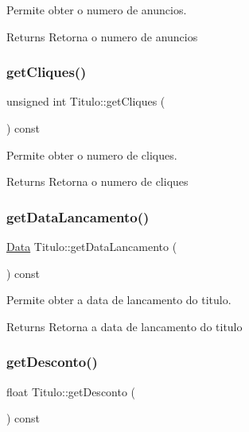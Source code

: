 Permite obter o numero de anuncios. 

\begin{DoxyReturn}{Returns}
Retorna o numero de anuncios 
\end{DoxyReturn}
\mbox{\label{class_titulo_a71d5b5985170de5612ec49c5c955f120}} 
\subsubsection{\texorpdfstring{get\+Cliques()}{getCliques()}}
{\footnotesize\ttfamily unsigned int Titulo\+::get\+Cliques (\begin{DoxyParamCaption}{ }\end{DoxyParamCaption}) const}



Permite obter o numero de cliques. 

\begin{DoxyReturn}{Returns}
Retorna o numero de cliques 
\end{DoxyReturn}
\mbox{\label{class_titulo_a1cb9b8c0a9dca73d5925922ccc041fa8}} 
\subsubsection{\texorpdfstring{get\+Data\+Lancamento()}{getDataLancamento()}}
{\footnotesize\ttfamily \mbox{\hyperlink{class_data}{Data}} Titulo\+::get\+Data\+Lancamento (\begin{DoxyParamCaption}{ }\end{DoxyParamCaption}) const}



Permite obter a data de lancamento do titulo. 

\begin{DoxyReturn}{Returns}
Retorna a data de lancamento do titulo 
\end{DoxyReturn}
\mbox{\label{class_titulo_ae7df7d468f8220fa32b2772df4c53081}} 
\subsubsection{\texorpdfstring{get\+Desconto()}{getDesconto()}}
{\footnotesize\ttfamily float Titulo\+::get\+Desconto (\begin{DoxyParamCaption}{ }\end{DoxyParamCaption}) const}



